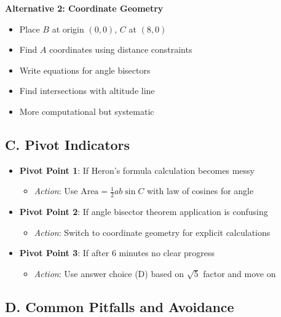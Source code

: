 \documentclass[12pt]{article}
\begin{document}
\begin{roadmapbox}
\textbf{Alternative 2: Coordinate Geometry}
\begin{itemize}
    \item Place $B$ at origin $(0,0)$, $C$ at $(8,0)$
    \item Find $A$ coordinates using distance constraints
    \item Write equations for angle bisectors
    \item Find intersections with altitude line
    \item More computational but systematic
\end{itemize}

\subsection*{C. Pivot Indicators}
\begin{itemize}[leftmargin=*]
    \item \textbf{Pivot Point 1}: If Heron's formula calculation becomes messy
    \begin{itemize}
        \item \textit{Action}: Use $\text{Area} = \frac{1}{2}ab\sin C$ with law of cosines for angle
    \end{itemize}
    \item \textbf{Pivot Point 2}: If angle bisector theorem application is confusing
    \begin{itemize}
        \item \textit{Action}: Switch to coordinate geometry for explicit calculations
    \end{itemize}
    \item \textbf{Pivot Point 3}: If after 6 minutes no clear progress
    \begin{itemize}
        \item \textit{Action}: Use answer choice (D) based on $\sqrt{5}$ factor and move on
    \end{itemize}
\end{itemize}

\subsection*{D. Common Pitfalls and Avoidance}


\end{roadmapbox}
\end{document}
